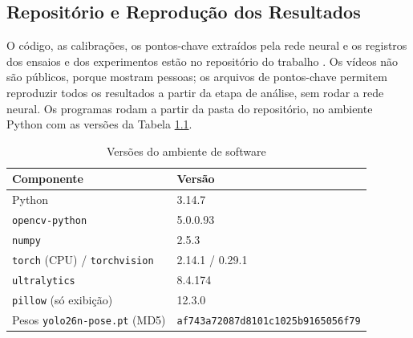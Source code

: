 \documentclass[
    12pt,               %
    openright,          %
    twoside,            %
    a4paper,            %
    chapter=TITLE,      %
    english,            %
    brazil              %
    ]{abntex2}
\begin{document}
\postextual


\begin{apendicesenv}
\partapendices

\chapter{Repositório e Reprodução dos Resultados}
\label{ap:repositorio}

O código, as calibrações, os pontos-chave extraídos pela rede neural e os registros dos ensaios e dos experimentos estão no repositório do trabalho \cite{santos2026repositorio}. Os vídeos não são públicos, porque mostram pessoas; os arquivos de pontos-chave permitem reproduzir todos os resultados a partir da etapa de análise, sem rodar a rede neural. Os programas rodam a partir da pasta do repositório, no ambiente Python com as versões da Tabela \ref{tab:versoes}.

\begin{table}[H]
\centering
\small
\caption{Versões do ambiente de software}
\label{tab:versoes}
\begin{tabular}{ll}
\hline
\textbf{Componente} & \textbf{Versão} \\
\hline
Python & 3.14.7 \\
\texttt{opencv-python} & 5.0.0.93 \\
\texttt{numpy} & 2.5.3 \\
\texttt{torch} (CPU) / \texttt{torchvision} & 2.14.1 / 0.29.1 \\
\texttt{ultralytics} & 8.4.174 \\
\texttt{pillow} (só exibição) & 12.3.0 \\
Pesos \texttt{yolo26n-pose.pt} (MD5) & \texttt{af743a72087d8101c1025b9165056f79} \\
\hline
\end{tabular}
\end{table}


\end{apendicesenv}
\end{document}
